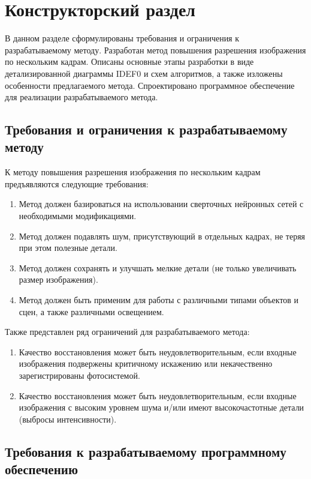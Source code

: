 \chapter{Конструкторский раздел}

В данном разделе сформулированы требования и ограничения к разрабатываемому методу. Разработан метод повышения разрешения изображения по нескольким кадрам. Описаны основные этапы разработки в виде детализированной диаграммы IDEF0 и схем алгоритмов, а также изложены особенности предлагаемого метода. Спроектировано программное обеспечение для реализации разрабатываемого метода.

\section{Требования и ограничения к разрабатываемому методу}

К методу повышения разрешения изображения по нескольким кадрам предъявляются следующие требования:

\begin{enumerate}
    \item Метод должен базироваться на использовании сверточных нейронных сетей с необходимыми модификациями.
    \item Метод должен подавлять шум, присутствующий в отдельных кадрах, не теряя при этом полезные детали.
    \item Метод должен сохранять и улучшать мелкие детали (не только увеличивать размер изображения).
    \item Метод должен быть применим для работы с различными типами объектов и сцен, а также различными освещением.
\end{enumerate}

Также представлен ряд ограничений для разрабатываемого метода:

\begin{enumerate}
    \item Качество восстановления может быть неудовлетворительным, если входные изображения подвержены критичному искажению или некачественно зарегистрированы фотосистемой.
    \item Качество восстановления может быть неудовлетворительным, если входные изображения с высоким уровнем шума и/или имеют высокочастотные детали (выбросы интенсивности).
\end{enumerate}

\section{Требования к разрабатываемому программному обеспечению}

